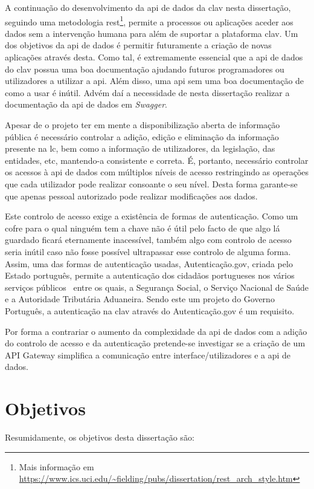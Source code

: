 A continuação do desenvolvimento da \acrshort{api} de dados da \acrshort{clav} nesta dissertação, seguindo uma metodologia \acrshort{rest}\footnote{Mais informação em \url{https://www.ics.uci.edu/~fielding/pubs/dissertation/rest_arch_style.htm}}, permite a processos ou aplicações aceder aos dados sem a intervenção humana para além de suportar a plataforma \acrshort{clav}. Um dos objetivos da \acrshort{api} de dados é permitir futuramente a criação de novas aplicações através desta. Como tal, é extremamente essencial que a \acrshort{api} de dados do \acrshort{clav} possua uma boa documentação ajudando futuros programadores ou utilizadores a utilizar a \acrshort{api}. Além disso, uma \acrshort{api} sem uma boa documentação de como a usar é inútil. Advém daí a necessidade de nesta dissertação realizar a documentação da \acrshort{api} de dados em \textit{Swagger}.

Apesar de o projeto ter em mente a disponibilização aberta de informação pública é necessário controlar a adição, edição e eliminação da informação presente na \acrlong{lc}, bem como a informação de utilizadores, da legislação, das entidades, etc, mantendo-a consistente e correta. É, portanto, necessário controlar os acessos à \acrshort{api} de dados com múltiplos níveis de acesso restringindo as operações que cada utilizador pode realizar consoante o seu nível. Desta forma garante-se que apenas pessoal autorizado pode realizar modificações aos dados.

Este controlo de acesso exige a existência de formas de autenticação. Como um cofre para o qual ninguém tem a chave não é útil pelo facto de que algo lá guardado ficará eternamente inacessível, também algo com controlo de acesso seria inútil caso não fosse possível ultrapassar esse controlo de alguma forma. Assim, uma das formas de autenticação usadas, Autenticação.gov, criada pelo Estado português, permite a autenticação dos cidadãos portugueses nos vários serviços públicos~\cite{authgov} entre os quais, a Segurança Social, o Serviço Nacional de Saúde e a Autoridade Tributária Aduaneira. Sendo este um projeto do Governo Português, a autenticação na \acrshort{clav} através do Autenticação.gov é um requisito.

Por forma a contrariar o aumento da complexidade da \acrshort{api} de dados com a adição do controlo de acesso e da autenticação pretende-se investigar se a criação de um API Gateway simplifica a comunicação entre interface/utilizadores e a \acrshort{api} de dados.

\section{Objetivos}
Resumidamente, os objetivos desta dissertação são:


